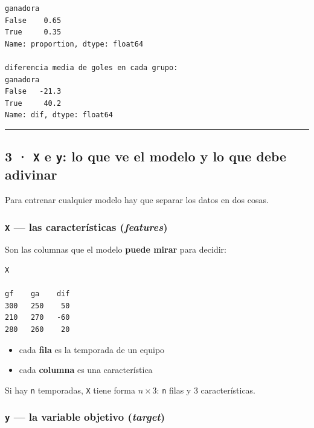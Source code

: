 \documentclass[
]{article}
\providecommand{\tightlist}{%
  \setlength{\itemsep}{0pt}\setlength{\parskip}{0pt}}
\begin{document}
\begin{verbatim}
ganadora
False    0.65
True     0.35
Name: proportion, dtype: float64

diferencia media de goles en cada grupo:
ganadora
False   -21.3
True     40.2
Name: dif, dtype: float64
\end{verbatim}

\protect{}\label{8c7d753c}
\begin{center}\rule{0.5\linewidth}{0.5pt}\end{center}

\subsection{\texorpdfstring{3 · \texttt{X} e \texttt{y}: lo que ve el
modelo y lo que debe
adivinar}{3 · X e y: lo que ve el modelo y lo que debe adivinar}}\label{3--x-e-y-lo-que-ve-el-modelo-y-lo-que-debe-adivinar}

Para entrenar cualquier modelo hay que separar los datos en dos cosas.

\subsubsection{\texorpdfstring{\texttt{X} --- las características
(\emph{features})}{X --- las características (features)}}\label{x--las-caracteruxedsticas-features}

Son las columnas que el modelo \textbf{puede mirar} para decidir:

\begin{verbatim}
X

gf    ga    dif
300   250    50
210   270   -60
280   260    20
\end{verbatim}

\begin{itemize}
\tightlist
\item
  cada \textbf{fila} es la temporada de un equipo
\item
  cada \textbf{columna} es una característica
\end{itemize}

Si hay \texttt{n} temporadas, \texttt{X} tiene forma \(n \times 3\):
\texttt{n} filas y 3 características.

\subsubsection{\texorpdfstring{\texttt{y} --- la variable objetivo
(\emph{target})}{y --- la variable objetivo (target)}}\label{y--la-variable-objetivo-target}
\end{document}
